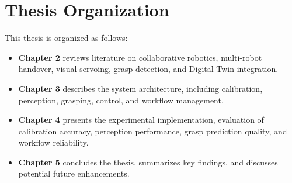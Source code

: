 \section{Thesis Organization}
This thesis is organized as follows:
\begin{itemize}
    \item \textbf{Chapter 2} reviews literature on collaborative robotics, multi-robot handover, visual servoing, grasp detection, and Digital Twin integration.
    \item \textbf{Chapter 3} describes the system architecture, including calibration, perception, grasping, control, and workflow management.
    \item \textbf{Chapter 4} presents the experimental implementation, evaluation of calibration accuracy, perception performance, grasp prediction quality, and workflow reliability.
    \item \textbf{Chapter 5} concludes the thesis, summarizes key findings, and discusses potential future enhancements.
\end{itemize}

\clearpage
